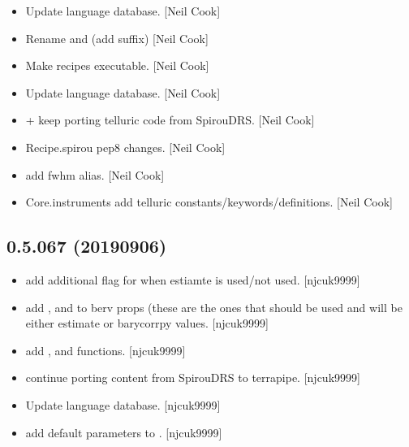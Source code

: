 \documentclass[a4paper,10pt,english]{report}
\begin{document}
\begin{itemize}
\item {} 
Update language database. {[}Neil Cook{]}

\item {} 
Rename  and  (add  suffix) {[}Neil Cook{]}

\item {} 
Make recipes executable. {[}Neil Cook{]}

\item {} 
Update language database. {[}Neil Cook{]}

\item {} 
 +  \sphinxhyphen{} keep porting telluric code from
SpirouDRS. {[}Neil Cook{]}

\item {} 
Recipe.spirou \sphinxhyphen{} pep8 changes. {[}Neil Cook{]}

\item {} 
 \sphinxhyphen{} add fwhm alias. {[}Neil Cook{]}

\item {} 
Core.instruments \sphinxhyphen{} add telluric constants/keywords/definitions. {[}Neil
Cook{]}

\end{itemize}


\subsection{0.5.067 (2019\sphinxhyphen{}09\sphinxhyphen{}06)}
\label{\detokenize{misc/changelog:id94}}\begin{itemize}
\item {} 
 \sphinxhyphen{} add additional flag for when estiamte is
used/not used. {[}njcuk9999{]}

\item {} 
 \sphinxhyphen{} add ,  and  to berv props
(these are the ones that should be used and will be either estimate or
barycorrpy values. {[}njcuk9999{]}

\item {} 
 \sphinxhyphen{} add ,
 and  functions. {[}njcuk9999{]}

\item {} 
 \sphinxhyphen{} continue porting content from SpirouDRS to
terrapipe. {[}njcuk9999{]}

\item {} 
Update language database. {[}njcuk9999{]}

\item {} 
 \sphinxhyphen{} add default parameters to .
{[}njcuk9999{]}

\end{itemize}
\end{document}
